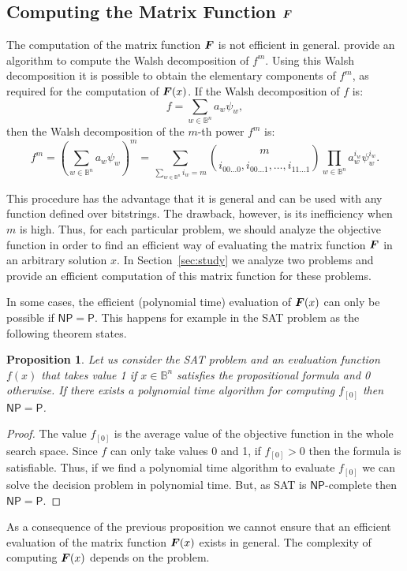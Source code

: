 \documentclass{article}
\newtheorem{proposition}{Proposition}
\def\vec#1{\mathchoice{\mbox{\boldmath$\displaystyle#1$}}
  {\mbox{\boldmath$\textstyle#1$}}
  {\mbox{\boldmath$\scriptstyle#1$}}
  {\mbox{\boldmath$\scriptscriptstyle#1$}}}
\newcommand{\comb}[2]{\binom{#1}{#2}}
\newcommand{\Bo}[0]{\mathbb{B}}
\newcommand{\NP}[0]{\mathsf{NP}}
\renewcommand{\P}[0]{\mathsf{P}}
\begin{document}
\subsection{Computing the Matrix Function $\vec{F}$}
\label{subsec:computing-f}

The computation of the matrix function $\vec{F}$ is not efficient in general. \cite{Sutton2011tcs} provide an algorithm to compute the Walsh decomposition of $f^m$. Using this Walsh decomposition it is possible to obtain the elementary components of $f^m$, as required for the computation of $\vec{F}(x)$. If the Walsh decomposition of $f$ is:
\[
f = \sum_{w \in \Bo^n} a_w \psi_w ,
\]
then the Walsh decomposition of the $m$-th power $f^m$ is:
\[
f^m = \left(\sum_{w \in \Bo^n} a_w \psi_w \right)^m = \sum_{\sum_{w \in \Bo^n}i_w=m} \comb{m}{i_{00\ldots0},i_{00\ldots1},\ldots,i_{11\ldots1}} \prod_{w \in \Bo^n} a_w^{i_w} \psi_{w}^{i_w} .
\]

This procedure has the advantage that it is general and can be used with any function defined over bitstrings. The drawback, however, is its inefficiency when $m$ is high. Thus, for each particular problem, we should analyze the objective function in order to find an efficient way of evaluating the matrix function $\vec{F}$ in an arbitrary solution $x$. In Section~\ref{sec:study} we analyze two problems and provide an efficient computation of this matrix function for these problems.

In some cases, the efficient (polynomial time) evaluation of $\vec{F}(x)$ can only be possible if $\NP=\P$. This happens for example in the SAT problem as the following theorem states.

\begin{proposition}
Let us consider the SAT problem and an evaluation function $f(x)$ that takes value 1 if $x \in \Bo^n$ satisfies the propositional formula and 0 otherwise. If there exists a polynomial time algorithm for computing $f_{[0]}$ then $\NP=\P$.
\end{proposition}
\begin{proof}
The value $f_{[0]}$ is the average value of the objective function in the whole search space. Since $f$ can only take values 0 and 1, if $f_{[0]}>0$ then the formula is satisfiable. Thus, if we find a polynomial time algorithm to evaluate $f_{[0]}$ we can solve the decision problem in polynomial time. But, as SAT is $\NP$-complete then $\NP=\P$.
\end{proof}

As a consequence of the previous proposition we cannot ensure that an efficient evaluation of the matrix function $\vec{F}(x)$ exists in general. The complexity of computing $\vec{F}(x)$  depends on the problem.
\end{document}
